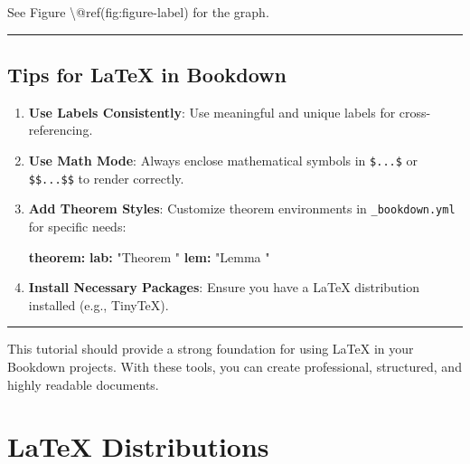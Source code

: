 \documentclass[
]{book}
\newenvironment{Shaded}{\begin{snugshade}}{\end{snugshade}}
\newcommand{\AttributeTok}[1]{\textcolor[rgb]{0.13,0.29,0.53}{#1}}
\newcommand{\FunctionTok}[1]{\textcolor[rgb]{0.13,0.29,0.53}{\textbf{#1}}}
\newcommand{\KeywordTok}[1]{\textcolor[rgb]{0.13,0.29,0.53}{\textbf{#1}}}
\newcommand{\NormalTok}[1]{#1}
\newcommand{\StringTok}[1]{\textcolor[rgb]{0.31,0.60,0.02}{#1}}
\theoremstyle{definition}
\theoremstyle{definition}
\theoremstyle{definition}
\theoremstyle{definition}
\theoremstyle{remark}
\begin{document}
\begin{Shaded}
\begin{Highlighting}[]
\NormalTok{See Figure \textbackslash{}@ref(fig:figure{-}label) for the graph.}
\end{Highlighting}
\end{Shaded}

\begin{center}\rule{0.5\linewidth}{0.5pt}\end{center}

\section{Tips for LaTeX in Bookdown}\label{tips-for-latex-in-bookdown}

\begin{enumerate}
\def\labelenumi{\arabic{enumi}.}
\item
  \textbf{Use Labels Consistently}: Use meaningful and unique labels for cross-referencing.
\item
  \textbf{Use Math Mode}: Always enclose mathematical symbols in \texttt{\$...\$} or \texttt{\$\$...\$\$} to render correctly.
\item
  \textbf{Add Theorem Styles}: Customize theorem environments in \texttt{\_bookdown.yml} for specific needs:

\begin{Shaded}
\begin{Highlighting}[]
\FunctionTok{theorem}\KeywordTok{:}
\AttributeTok{  }\FunctionTok{lab}\KeywordTok{:}\AttributeTok{ }\StringTok{"Theorem "}
\AttributeTok{  }\FunctionTok{lem}\KeywordTok{:}\AttributeTok{ }\StringTok{"Lemma "}
\end{Highlighting}
\end{Shaded}
\item
  \textbf{Install Necessary Packages}: Ensure you have a LaTeX distribution installed (e.g., TinyTeX).
\end{enumerate}

\begin{center}\rule{0.5\linewidth}{0.5pt}\end{center}

This tutorial should provide a strong foundation for using LaTeX in your Bookdown projects. With these tools, you can create professional, structured, and highly readable documents.

\chapter{LaTeX Distributions}\label{latex-distributions}
\end{document}
